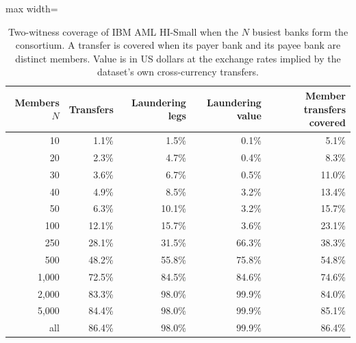 \begin{table}[!htbp]\centering\small
\caption{Two-witness coverage of IBM AML HI-Small when the $N$ busiest banks form the consortium. A transfer is covered when its payer bank and its payee bank are distinct members. Value is in US dollars at the exchange rates implied by the dataset's own cross-currency transfers.}\label{tab:coverage}
\begin{adjustbox}{max width=\linewidth}\begin{tabular}{rrrrr}\toprule
Members $N$ & Transfers & Laundering legs & Laundering value & Member transfers covered \\\midrule
10 & 1.1\% & 1.5\% & 0.1\% & 5.1\% \\
20 & 2.3\% & 4.7\% & 0.4\% & 8.3\% \\
30 & 3.6\% & 6.7\% & 0.5\% & 11.0\% \\
40 & 4.9\% & 8.5\% & 3.2\% & 13.4\% \\
50 & 6.3\% & 10.1\% & 3.2\% & 15.7\% \\
100 & 12.1\% & 15.7\% & 3.6\% & 23.1\% \\
250 & 28.1\% & 31.5\% & 66.3\% & 38.3\% \\
500 & 48.2\% & 55.8\% & 75.8\% & 54.8\% \\
1{,}000 & 72.5\% & 84.5\% & 84.6\% & 74.6\% \\
2{,}000 & 83.3\% & 98.0\% & 99.9\% & 84.0\% \\
5{,}000 & 84.4\% & 98.0\% & 99.9\% & 85.1\% \\
all & 86.4\% & 98.0\% & 99.9\% & 86.4\% \\
\bottomrule\end{tabular}\end{adjustbox}\end{table}